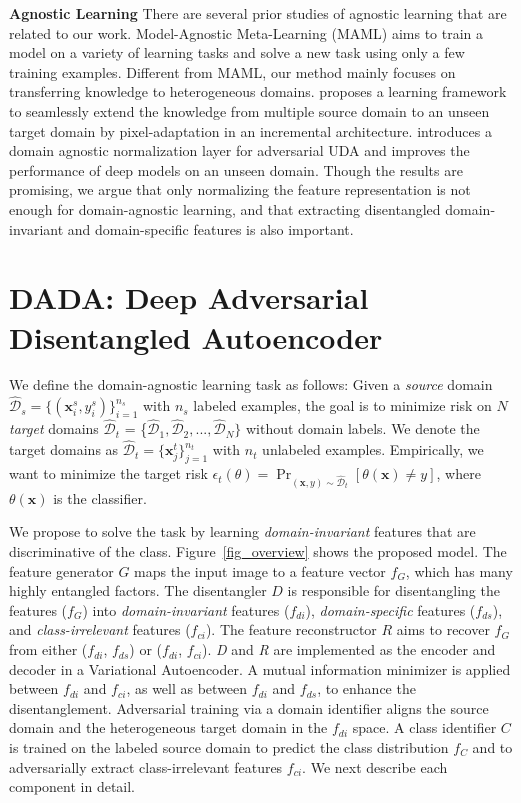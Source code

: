 \documentclass{article}
\begin{document}
\textbf{Agnostic Learning} There are several prior studies of agnostic learning that are 
related to our work. Model-Agnostic Meta-Learning (MAML) \cite{maml} aims to train a model on a variety of learning tasks and solve a new task using only a few training examples. Different from MAML, our method mainly focuses on transferring knowledge to heterogeneous domains. \citet{agnostic_dg_2018} proposes a learning framework to seamlessly extend the knowledge from multiple source domain to an unseen target domain by pixel-adaptation in an incremental architecture. \citet{domain_agnostic_norm18} introduces a domain agnostic normalization layer for  adversarial UDA and improves the performance of deep models on an unseen domain. Though the results are promising, we argue that only normalizing the feature representation is not enough for domain-agnostic learning, and that extracting disentangled domain-invariant and domain-specific features is also important.  \section{DADA: Deep Adversarial Disentangled Autoencoder}
\label{dada}



We define the domain-agnostic learning task as follows: Given a \emph{source} domain $\widehat{\mathcal{D}}_s = \{(\mathbf{x}_i^s,y^s_i)\}_{i=1}^{n_s}$ with $n_s$ labeled examples, the goal is to minimize risk on $N$ \emph{target} domains $\widehat{\mathcal{D}}_t$ = \{$\widehat{\mathcal{D}}_1, \widehat{\mathcal{D}}_2, ... ,\widehat{\mathcal{D}}_N\}$ without domain labels. We denote the target domains as $\widehat{\mathcal{D}}_t = \{\mathbf{x}_j^t\}_{j=1}^{n_t}$ with $n_t$ unlabeled examples. 
Empirically, we want to minimize the target risk ${\epsilon_t}\left( \theta  \right) = {\Pr _{\left( {{\mathbf{x}},y} \right) \sim \widehat{\mathcal{D}}_t }}\left[ {\theta \left( {\mathbf{x}} \right) \ne y} \right]$, where $\theta\left(\mathbf{x}\right)$ is the classifier.


We propose to solve the task by learning \textit{domain-invariant} features that are discriminative of the class.
Figure~\ref{fig_overview} shows the proposed model. The feature generator $G$ maps the input image to a feature vector $f_G$, which has many highly entangled factors. The disentangler $D$ is responsible for disentangling the features ($f_G$) 
into \textit{domain-invariant} features ($f_{di}$), \textit{domain-specific} features ($f_{ds}$), and \textit{class-irrelevant} features ($f_{ci}$). The feature reconstructor $R$ aims to recover $f_G$ from either ($f_{di}$, $f_{ds}$) or ($f_{di}$, $f_{ci}$).
\textit{D} and \textit{R} are implemented as the encoder and decoder in a Variational Autoencoder. A mutual information minimizer is applied between $f_{di}$ and $f_{ci}$, as well as between $f_{di}$ and $f_{ds}$, to enhance the disentanglement. Adversarial training via a domain identifier aligns the source domain and the heterogeneous target domain in the $f_{di}$ space. A class identifier $C$ is trained on the labeled source domain 
to predict the class distribution $f_C$ and to adversarially extract class-irrelevant features $f_{ci}$. We next describe each component in detail.
\end{document}
